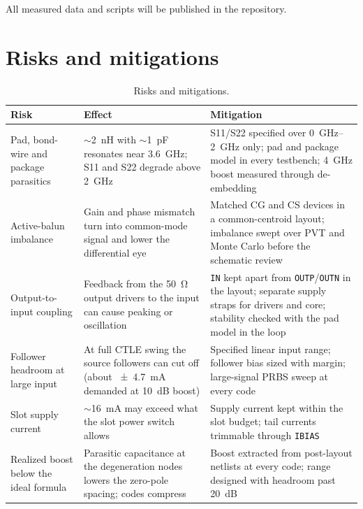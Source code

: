 \documentclass[11pt,a4paper]{article}
\newcommand{\pin}[1]{\texttt{#1}}
\begin{document}
All measured data and scripts will be published in the repository.

\section{Risks and mitigations}

\begin{table}[H]
\centering\small
\caption{Risks and mitigations.}
\begin{tabularx}{\linewidth}{@{}>{\raggedright\arraybackslash}p{3.3cm} L L@{}}
\toprule
Risk & Effect & Mitigation \\
\midrule
Pad, bond-wire and package parasitics & $\sim$\SI{2}{nH} with $\sim$\SI{1}{pF} resonates near \SI{3.6}{GHz}; S11 and S22 degrade above \SI{2}{GHz} & S11/S22 specified over \SIrange{0}{2}{GHz} only; pad and package model in every testbench; \SI{4}{GHz} boost measured through de-embedding \\
Active-balun imbalance & Gain and phase mismatch turn into common-mode signal and lower the differential eye & Matched CG and CS devices in a common-centroid layout; imbalance swept over PVT and Monte Carlo before the schematic review \\
Output-to-input coupling & Feedback from the \SI{50}{\ohm} output drivers to the input can cause peaking or oscillation & \pin{IN} kept apart from \pin{OUTP}/\pin{OUTN} in the layout; separate supply straps for drivers and core; stability checked with the pad model in the loop \\
Follower headroom at large input & At full CTLE swing the source followers can cut off (about \SI{\pm4.7}{mA} demanded at \SI{10}{dB} boost) & Specified linear input range; follower bias sized with margin; large-signal PRBS sweep at every code \\
Slot supply current & $\sim$\SI{16}{mA} may exceed what the slot power switch allows & Supply current kept within the slot budget; tail currents trimmable through \pin{IBIAS} \\
Realized boost below the ideal formula & Parasitic capacitance at the degeneration nodes lowers the zero-pole spacing; codes compress & Boost extracted from post-layout netlists at every code; range designed with headroom past \SI{20}{dB} \\
\bottomrule
\end{tabularx}
\end{table}
\end{document}
